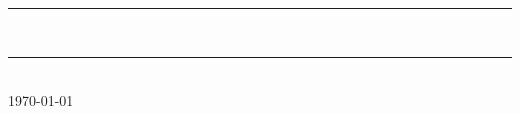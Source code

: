 \begin{titlepage}
\centering
\hrule
\vspace{20pt}
\huge{\@title}\\
\vspace{10pt}
\Large{\subtitulo}
\vspace{20pt}
\hrule
\vfill
\large{\@author}\\
\vspace{10pt}
\small{\today}
\end{titlepage}

\setcounter{page}{1}